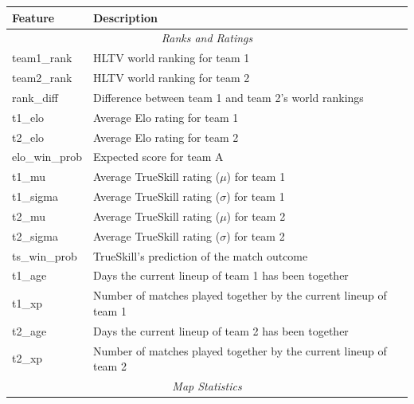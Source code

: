 \begin{table}[h]
	\centering
	\small
    \begin{tabular}{|l|l|}
	\hline
	\rule{0pt}{3ex}\textbf{Feature}      & \textbf{Description} \\ \hline
	\multicolumn{2}{|c|}{\rule{0pt}{2.6ex}\textit{Ranks and Ratings}} \\ \hline
		team1\_rank           & HLTV world ranking for team 1                                          \\ \hline
		team2\_rank           & HLTV world ranking for team 2                                          \\ \hline
		rank\_diff            & Difference between team 1 and team 2's world rankings                  \\ \hline
		t1\_elo               & Average Elo rating for team 1			                               \\ \hline
		t2\_elo               & Average Elo rating for team 2			                               \\ \hline
		elo\_win\_prob        & Expected score for team A                                              \\ \hline
		t1\_mu                & Average TrueSkill rating ($\mu$) for team 1                            \\ \hline
		t1\_sigma             & Average TrueSkill rating ($\sigma$) for team 1                         \\ \hline
		t2\_mu                & Average TrueSkill rating ($\mu$) for team 2                            \\ \hline
		t2\_sigma             & Average TrueSkill rating ($\sigma$) for team 2                         \\ \hline
		ts\_win\_prob         & TrueSkill's prediction of the match outcome                            \\ \hline
		t1\_age               & Days the current lineup of team 1 has been together                    \\ \hline
		t1\_xp                & Number of matches played together by the current lineup of team 1      \\ \hline
		t2\_age               & Days the current lineup of team 2 has been together                    \\ \hline
		t2\_xp                & Number of matches played together by the current lineup of team 2      \\ \hline
	\multicolumn{2}{|c|}{\rule{0pt}{2.6ex}\textit{Map Statistics}} 	 								   \\ \hline

\end{tabular}
\end{table}
